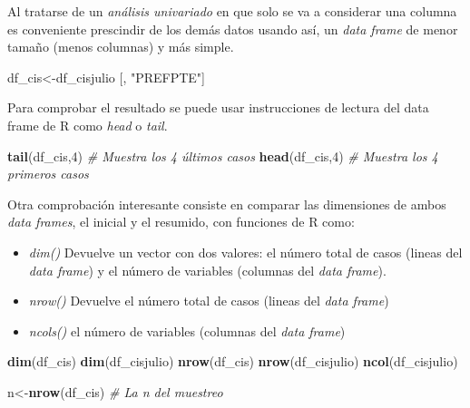 \documentclass[
  12 pt,
  a4paper,
]{article}
\newenvironment{Shaded}{\begin{snugshade}}{\end{snugshade}}
\newcommand{\CommentTok}[1]{\textcolor[rgb]{0.56,0.35,0.01}{\textit{#1}}}
\newcommand{\DecValTok}[1]{\textcolor[rgb]{0.00,0.00,0.81}{#1}}
\newcommand{\FunctionTok}[1]{\textcolor[rgb]{0.13,0.29,0.53}{\textbf{#1}}}
\newcommand{\NormalTok}[1]{#1}
\newcommand{\OtherTok}[1]{\textcolor[rgb]{0.56,0.35,0.01}{#1}}
\newcommand{\StringTok}[1]{\textcolor[rgb]{0.31,0.60,0.02}{#1}}
\providecommand{\tightlist}{%
  \setlength{\itemsep}{0pt}\setlength{\parskip}{0pt}}
\begin{document}
Al tratarse de un \emph{análisis univariado} en que solo se va a
considerar una columna es conveniente prescindir de los demás datos
usando así, un \emph{data frame} de menor tamaño (menos columnas) y más
simple.

\begin{Shaded}
\begin{Highlighting}[]
\NormalTok{df\_cis}\OtherTok{\textless{}{-}}\NormalTok{df\_cisjulio [, }\StringTok{"PREFPTE"}\NormalTok{]}
\end{Highlighting}
\end{Shaded}

Para comprobar el resultado se puede usar instrucciones de lectura del
data frame de R como \emph{head} o \emph{tail}.

\begin{Shaded}
\begin{Highlighting}[]
\FunctionTok{tail}\NormalTok{(df\_cis,}\DecValTok{4}\NormalTok{) }\CommentTok{\# Muestra los 4 últimos casos}
\FunctionTok{head}\NormalTok{(df\_cis,}\DecValTok{4}\NormalTok{) }\CommentTok{\# Muestra los 4 primeros casos}
\end{Highlighting}
\end{Shaded}

Otra comprobación interesante consiste en comparar las dimensiones de
ambos \emph{data frames}, el inicial y el resumido, con funciones de R
como:

\begin{itemize}
\tightlist
\item
  \emph{dim()} Devuelve un vector con dos valores: el número total de
  casos (lineas del \emph{data frame}) y el número de variables
  (columnas del \emph{data frame}).
\item
  \emph{nrow()} Devuelve el número total de casos (lineas del \emph{data
  frame})
\item
  \emph{ncols()} el número de variables (columnas del \emph{data frame})
\end{itemize}

\begin{Shaded}
\begin{Highlighting}[]
\FunctionTok{dim}\NormalTok{(df\_cis)}
\FunctionTok{dim}\NormalTok{(df\_cisjulio)}
\FunctionTok{nrow}\NormalTok{(df\_cis)}
\FunctionTok{nrow}\NormalTok{(df\_cisjulio)}
\FunctionTok{ncol}\NormalTok{(df\_cisjulio)}

\NormalTok{n}\OtherTok{\textless{}{-}}\FunctionTok{nrow}\NormalTok{(df\_cis) }\CommentTok{\# La n del muestreo}
\end{Highlighting}
\end{Shaded}
\end{document}
